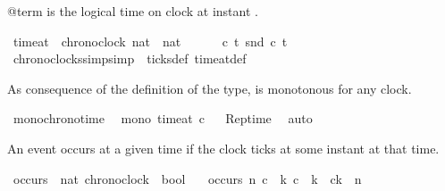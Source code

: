 \begin{isabellebody}
\begin{isamarkuptext}
@term{} is the logical time on clock  at instant .%
\end{isamarkuptext}\isamarkuptrue%
\isamarkupfalse%
\ time{\isacharunderscore}at\ {\isacharcolon}{\isacharcolon}\ {\isacartoucheopen}{\isacharbrackleft}chronoclock{\isacharcomma}\ nat{\isacharbrackright}\ {\isasymRightarrow}\ nat{\isacartoucheclose}\ {\isacharparenleft}{\isacartoucheopen}{\isacharunderscore}\isactrlbsub {\isacharunderscore}\isactrlesub {\isacartoucheclose}\ {\isacharbrackleft}{}{}{\isacharcomma}\ {}{}{\isacharbrackright}{\isacharparenright}\isanewline
\ \ \ {\isacartoucheopen}{\isasymlambda}c\ t{\isachardot}\ {\isacharparenleft}snd\ c{\isacharparenright}\ t{\isacartoucheclose}%
\isadelimproof
\ %
\endisadelimproof
%
\isatagproof
\isacommand{{\isachardot}}\isamarkupfalse%
%
\endisatagproof
{\isafoldproof}%
%
\isadelimproof
%
\endisadelimproof
\isanewline
\isanewline
{}\isamarkupfalse%
\ chronoclocks{\isacharunderscore}simp{\isacharbrackleft}simp{\isacharbrackright}\ {\isacharequal}\ ticks{\isacharunderscore}def\ time{\isacharunderscore}at{\isacharunderscore}def%
\begin{isamarkuptext}%
As consequence of the definition of the  type, \isa{{\isacharparenleft}{\isasymnabla}{\isacharparenright}} is monotonous for any clock.%
\end{isamarkuptext}\isamarkuptrue%
\isamarkupfalse%
\ mono{\isacharunderscore}chronotime{\isacharcolon}\isanewline
\ \ {\isacartoucheopen}mono\ {\isacharparenleft}time{\isacharunderscore}at\ c{\isacharparenright}{\isacartoucheclose}%
\isadelimproof
\ %
\endisadelimproof
%
\isatagproof
{}\isamarkupfalse%
\ Rep{\isacharunderscore}time\ \isamarkupfalse%
\ auto%
\endisatagproof
{\isafoldproof}%
%
\isadelimproof
%
\endisadelimproof
%
\begin{isamarkuptext}%
An event occurs at a given time if the clock ticks at some instant at that time.%
\end{isamarkuptext}\isamarkuptrue%
\isamarkupfalse%
\ occurs\ {\isacharcolon}{\isacharcolon}\ {\isacartoucheopen}{\isacharbrackleft}nat{\isacharcomma}\ chronoclock{\isacharbrackright}\ {\isasymRightarrow}\ bool{\isacartoucheclose}\isanewline
\ \ \ {\isacartoucheopen}occurs\ n\ c\ {\isasymequiv}\ {\isasymexists}k{\isachardot}\ {\isacharparenleft}c\ {\isasymnabla}\ k\ {\isasymand}\ c\isactrlbsub k\isactrlesub \ {\isacharequal}\ n{\isacharparenright}{\isacartoucheclose}%

\end{isabellebody}
